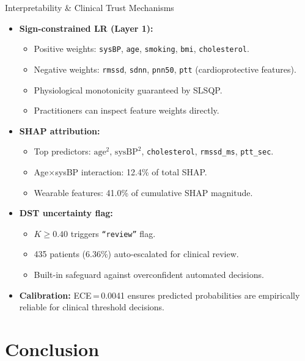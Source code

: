 \documentclass[aspectratio=169]{beamer}
\begin{document}
\begin{frame}{Interpretability \& Clinical Trust Mechanisms}
  \begin{itemize}
    \item \textbf{Sign-constrained LR (Layer 1):}
      \begin{itemize}\small
        \item Positive weights: \texttt{sysBP}, \texttt{age},
              \texttt{smoking}, \texttt{bmi}, \texttt{cholesterol}.
        \item Negative weights: \texttt{rmssd}, \texttt{sdnn},
              \texttt{pnn50}, \texttt{ptt} (cardioprotective features).
        \item Physiological monotonicity guaranteed by SLSQP.
        \item Practitioners can inspect feature weights directly.
      \end{itemize}
    \item \textbf{SHAP attribution:}
      \begin{itemize}\small
        \item Top predictors: $\mathrm{age}^2$, $\mathrm{sysBP}^2$,
              \texttt{cholesterol}, \texttt{rmssd\_ms}, \texttt{ptt\_sec}.
        \item Age$\times$sysBP interaction: 12.4\% of total SHAP.
        \item Wearable features: 41.0\% of cumulative SHAP magnitude.
      \end{itemize}
    \item \textbf{DST uncertainty flag:}
      \begin{itemize}\small
        \item $K{\geq}0.40$ triggers \texttt{``review''} flag.
        \item 435 patients (6.36\%) auto-escalated for clinical review.
        \item Built-in safeguard against overconfident automated decisions.
      \end{itemize}
    \item \textbf{Calibration:} ECE\,=\,0.0041 ensures predicted probabilities
          are empirically reliable for clinical threshold decisions.
  \end{itemize}
\end{frame}

\section{Conclusion}
\end{document}
